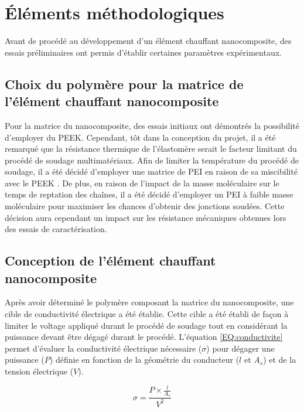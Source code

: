 \section{Éléments méthodologiques}

Avant de procédé au développement d'un élément chauffant nanocomposite, des essais préliminaires ont permis d'établir certaines paramètres expérimentaux. 

\subsection{Choix du polymère pour la matrice de l'élément chauffant nanocomposite}

Pour la matrice du nanocomposite, des essais initiaux ont démontrés la possibilité d'employer du PEEK. 
Cependant, tôt dans la conception du projet, il a été remarqué que la résistance thermique de l'élastomère serait le facteur limitant du procédé de soudage multimatériaux. 
Afin de limiter la température du procédé de soudage, il a été décidé d'employer une matrice de PEI en raison de sa miscibilité avec le PEEK \cite{Torre1992,Crevecoeur1991}. 
De plus, en raison de l'impact de la masse moléculaire sur le temps de reptation des chaînes, il a été décidé d'employer un PEI à faible masse moléculaire pour maximiser les chances d'obtenir des jonctions soudées. 
Cette décision aura cependant un impact sur les résistance mécaniques obtenues lors des essais de caractérisation. 

\subsection{Conception de l'élément chauffant nanocomposite}

Après avoir déterminé le polymère composant la matrice du nanocomposite, une cible de conductivité électrique a été établie. 
Cette cible a été établi de façon à limiter le voltage appliqué durant le procédé de soudage tout en considérant la puissance devant être dégagé durant le procédé. 
L'équation \ref{EQ:conductivite} permet d'évaluer la conductivité électrique nécessaire ($\sigma$) pour dégager une puissance ($P$) définie en fonction de la géométrie du conducteur ($l$ et $A_s$) et de la tension électrique ($V$). 

\begin{equation}
\label{EQ:conductivite}
\sigma = \frac{P \times \frac{l}{A_s}}{V^2}
\end{equation} 

